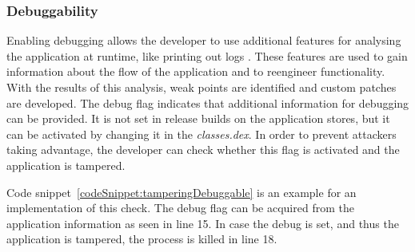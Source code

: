 \subsubsection{Debuggability} \label{subsection:section:counter-improve-tampering-debuggable}
Enabling debugging allows the developer to use additional features for analysing the application at runtime, like printing out logs \cite{androidDebugging}.
These features are used to gain information about the flow of the application and to reengineer functionality.
With the results of this analysis, weak points are identified and custom patches are developed.
\newline
The debug flag indicates that additional information for debugging can be provided.
It is not set in release builds on the application stores, but it can be activated by changing it in the \textit{classes.dex}.
In order to prevent attackers taking advantage, the developer can check whether this flag is activated and the application is tampered.
\newline

Code snippet~\ref{codeSnippet:tamperingDebuggable} is an example for an implementation of this check.
The debug flag can be acquired from the application information as seen in line 15.
In case the debug is set, and thus the application is tampered, the process is killed in line 18.
